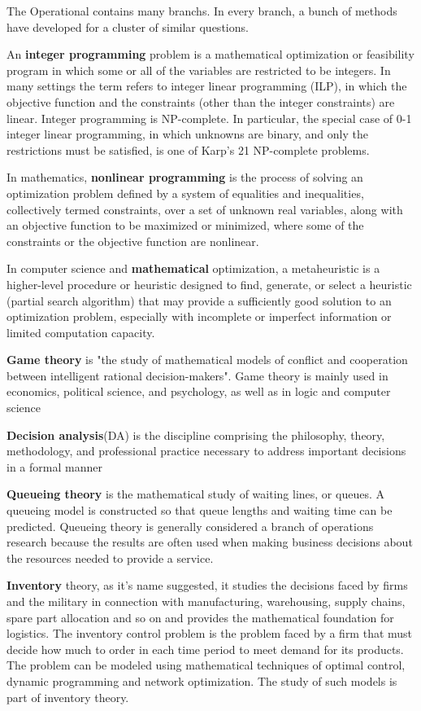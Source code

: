 \documentclass[10pt, a4paper, twocolumn]{article} %
\begin{document}
The Operational contains many branchs. In every branch, a bunch of methods have
developed for a cluster of similar questions.

An \textbf{integer programming} problem is a mathematical optimization or feasibility
program in which some or all of the variables are restricted to be integers. In
many settings the term refers to integer linear programming (ILP), in which the
objective function and the constraints (other than the integer constraints) are
linear.  Integer programming is NP-complete. In particular, the special case of
0-1 integer linear programming, in which unknowns are binary, and only the
restrictions must be satisfied, is one of Karp's 21 NP-complete problems.

In mathematics, \textbf{nonlinear programming} is the process of solving an optimization
problem defined by a system of equalities and inequalities, collectively termed
constraints, over a set of unknown real variables, along with an objective
function to be maximized or minimized, where some of the constraints or the
objective function are nonlinear.\citep{Reference13}

In computer science and \textbf{mathematical} optimization, a metaheuristic is a
higher-level procedure or heuristic designed to find, generate, or select a
heuristic (partial search algorithm) that may provide a sufficiently good
solution to an optimization problem, especially with incomplete or imperfect
information or limited computation capacity.\citep{Reference12}

\textbf{Game theory} \citep{Reference11} is "the study of mathematical models of conflict and cooperation
between intelligent rational decision-makers". Game theory is mainly used in
economics, political science, and psychology, as well as in logic and computer science

\textbf{Decision analysis}(DA) is the discipline comprising the philosophy, theory,
methodology, and professional practice necessary to address important decisions in a formal manner

\textbf{Queueing theory} \citep{Reference10}is the mathematical study of waiting lines, or queues.
A queueing model is constructed so that queue lengths and waiting time can be
predicted.\citep{Reference10} Queueing theory is generally considered a branch
of operations research because the results are often used when making business
decisions about the resources needed to provide a service.

\textbf{Inventory} theory, as it's name suggested, it studies the decisions faced by firms and
the military in connection with manufacturing, warehousing, supply chains, spare
part allocation and so on and provides the mathematical foundation for
logistics. The inventory control problem is the problem faced by a firm that
must decide how much to order in each time period to meet demand for its
products. The problem can be modeled using mathematical techniques of optimal
control, dynamic programming and network optimization. The study of such models
is part of inventory theory.
\end{document}
